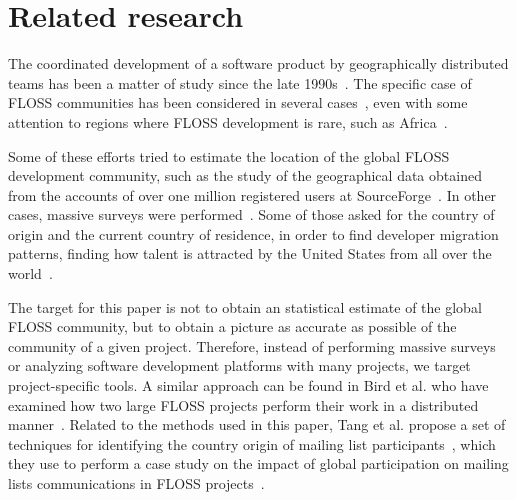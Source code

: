 \documentclass{sig-alternate-05-2015}
\begin{document}
%
%
% 


\section{Related research}
\label{sec:related}

The coordinated development of a software product by geographically distributed
teams has been a matter of study since the late 1990s~\cite{carmel1999global}.
The specific case of FLOSS communities has been considered in several cases~\cite{german2003gnome,engelhardt2009geographic,von2010geographic}, even with some attention to regions where FLOSS development is rare, such as Africa~\cite{ouattara2013open}.

Some of these efforts tried to estimate the location of the global FLOSS development community, such as the study of the geographical data obtained from the accounts of over one million registered users at SourceForge~\cite{robles2006geographic,gonzalez2008geographic}. In other cases, massive surveys were performed~\cite{ghosh2002free,david2008community}. Some of those asked for the country of origin and the current country of residence, in order to find developer migration patterns, finding how talent is attracted by the United States from all over the world~\cite{ghosh2002free}.

The target for this paper is not to obtain an statistical estimate of the global FLOSS community, but to obtain a picture as accurate as possible of the community of a given project. Therefore, instead of performing massive surveys or analyzing software development platforms with many projects, we target project-specific tools. A similar approach can be found in Bird et al. who have examined how two large FLOSS projects perform their work in a distributed manner~\cite{bird2012examining}. Related to the methods used in this paper, Tang et al. propose a set of 
techniques for identifying the country origin of mailing list participants~\cite{tang2009techniques}, which they use to perform a case study on the impact of global participation on mailing lists communications in FLOSS projects~\cite{tang2009case}.
\end{document}
